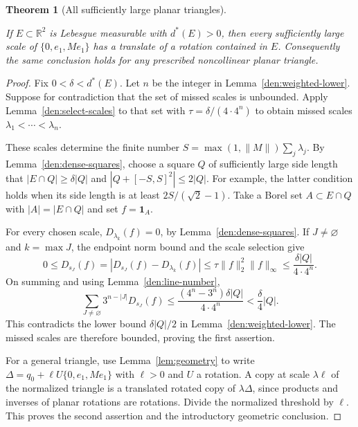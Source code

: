\documentclass[11pt]{amsart}
\newcommand{\R}{\mathbb R}
\newcommand{\one}{\mathbf 1}
\newtheorem{theorem}{Theorem}[section]
\theoremstyle{definition}
\theoremstyle{remark}
\numberwithin{equation}{section}
\providecommand{\lean}[1]{}
\providecommand{\leanok}{}
\begin{document}
\begin{theorem}[All sufficiently large planar triangles]\label{den:main}
\lean{Auto.den_main,Auto.den_main_general}
\leanok
If $E\subset\R^2$ is Lebesgue measurable with $d^*(E)>0$,
then every sufficiently large scale of
$\{0,e_1,Me_1\}$ has a translate of a rotation contained
in $E$.  Consequently the same conclusion holds for any
prescribed noncollinear planar triangle.
\end{theorem}
\begin{proof}
Fix $0<\delta<d^*(E)$.  Let $n$ be the integer in
Lemma~\ref{den:weighted-lower}.  Suppose for contradiction
that the set of missed scales is unbounded.  Apply
Lemma~\ref{den:select-scales} to that set with
$\tau=\delta/(4\cdot4^n)$ to obtain missed scales
$\lambda_1<\cdots<\lambda_n$.

These scales determine the finite number
$S=\max(1,\|M\|)\sum_j\lambda_j$.  By
Lemma~\ref{den:dense-squares}, choose a square $Q$ of
sufficiently large side length that
$|E\cap Q|\ge\delta|Q|$ and $|Q+[-S,S]^2|\le2|Q|$.
For example, the latter condition holds when its side
length is at least $2S/(\sqrt2-1)$.  Take a Borel set
$A\subset E\cap Q$ with $|A|=|E\cap Q|$ and set
$f=\one_A$.

For every chosen scale, $D_{\lambda_k}(f)=0$, by
Lemma~\ref{den:dense-squares}.  If $J\ne\varnothing$ and
$k=\max J$, the endpoint norm bound and the scale selection
give
\[
 0\le D_{s_J}(f)
   =|D_{s_J}(f)-D_{\lambda_k}(f)|
   \le \tau\|f\|_2^2\|f\|_\infty
   \le\frac{\delta|Q|}{4\cdot4^n}.
\]
On summing and using Lemma~\ref{den:line-number},
\[
 \sum_{J\ne\varnothing}3^{n-|J|}D_{s_J}(f)
    \le\frac{(4^n-3^n)\delta|Q|}{4\cdot4^n}
    <\frac{\delta}{4}|Q|.
\]
This contradicts the lower bound $\delta|Q|/2$ in
Lemma~\ref{den:weighted-lower}.  The missed scales are
therefore bounded, proving the first assertion.

For a general triangle, use Lemma~\ref{lem:geometry} to write
$\Delta=q_0+\ell U\{0,e_1,Me_1\}$ with $\ell>0$ and
$U$ a rotation.  A copy at scale $\lambda\ell$ of the
normalized triangle is a translated rotated copy of
$\lambda\Delta$, since products and inverses of planar
rotations are rotations.  Divide the normalized threshold
by $\ell$.  This proves the second assertion and the
introductory geometric conclusion.
\end{proof}
\end{document}

